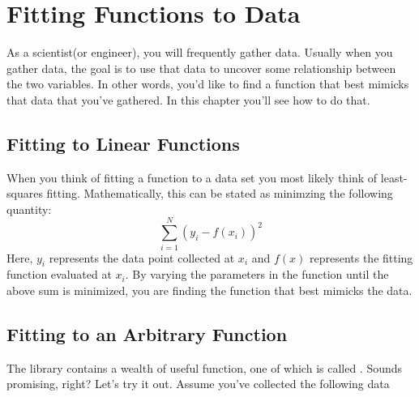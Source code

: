 \chapter{Fitting Functions to Data}
\label{chap:Fitting}

As a scientist(or engineer), you will frequently gather data.  Usually
when you gather data, the goal is to use that data to uncover some
relationship between the two variables.  In other words, you'd like to
find a function that best mimicks that data that you've gathered.  In
this chapter you'll see how to do that.

\section{Fitting to Linear Functions}
When you think of fitting a function to a data set you most likely
think of least-squares fitting.  Mathematically, this can be stated
as minimzing the following quantity:
\begin{equation}
\sum_{i=1}^N (y_i - f(x_i))^2
\end{equation}
Here, $y_i$ represents the data point collected at $x_i$ and $f(x)$ represents
the fitting function evaluated at $x_i$.  By varying the parameters in
the function until the above sum is minimized, you are finding the
function that best mimicks the data.

\section{Fitting to an Arbitrary Function}
The  library contains a wealth of useful function, one
of which is called .  Sounds promising, right?
Let's try it out.  Assume you've collected the following data

